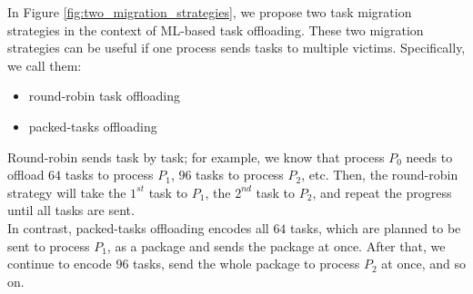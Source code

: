 In Figure \ref{fig:two_migration_strategies}, we propose two task migration strategies in the context of ML-based task offloading. These two migration strategies can be useful if one process sends tasks to multiple victims. Specifically, we call them:
\begin{itemize}
	\item round-robin task offloading
	\item packed-tasks offloading
\end{itemize}

Round-robin sends task by task; for example, we know that process $P_{0}$ needs to offload $64$ tasks to process $P_{1}$, $96$ tasks to process $P_{2}$, etc. Then, the round-robin strategy will take the $1^{st}$ task to $P_{1}$, the $2^{nd}$ task to $P_{2}$, and repeat the progress until all tasks are sent.\\

In contrast, packed-tasks offloading encodes all $64$ tasks, which are planned to be sent to process $P_{1}$, as a package and sends the package at once. After that, we continue to encode $96$ tasks, send the whole package to process $P_{2}$ at once, and so on.

